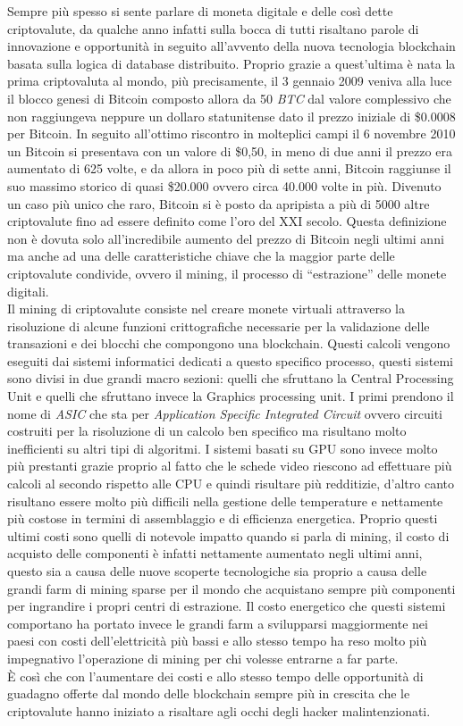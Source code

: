 \documentclass[
11pt, %
oneside, %
english, %
onehalfspacing,%
headsepline, %
]{MastersDoctoralThesis} %
\begin{document}
Sempre più spesso si sente parlare di moneta digitale e delle così dette criptovalute, da qualche anno infatti sulla bocca di tutti risaltano parole di innovazione e opportunità in seguito all'avvento della nuova tecnologia blockchain basata sulla logica di database distribuito. Proprio grazie a quest'ultima è nata la prima criptovaluta al mondo, più precisamente, il 3 gennaio 2009 veniva alla luce il blocco genesi di Bitcoin composto allora da 50 \emph{BTC} dal valore complessivo che non raggiungeva neppure un dollaro statunitense dato il prezzo iniziale di \$0.0008 per Bitcoin. In seguito all'ottimo riscontro in molteplici campi il 6 novembre 2010 un Bitcoin si presentava con un valore di \$0,50, in meno di due anni il prezzo era aumentato di 625 volte, e da allora in poco più di sette anni, Bitcoin raggiunse il suo massimo storico di quasi \$20.000 ovvero circa 40.000 volte in più. Divenuto un caso più unico che raro, Bitcoin si è posto da apripista a più di 5000 altre criptovalute fino ad essere definito come l'oro del \RN{21} secolo. Questa definizione non è dovuta solo all'incredibile aumento del prezzo di Bitcoin negli ultimi anni ma anche ad una delle caratteristiche chiave che la maggior parte delle criptovalute condivide, ovvero il mining, il processo di ``estrazione'' delle monete digitali.\\
Il mining di criptovalute consiste nel creare monete virtuali attraverso la risoluzione di alcune funzioni crittografiche necessarie per la validazione delle transazioni e dei blocchi che compongono una blockchain. Questi calcoli vengono eseguiti dai sistemi informatici dedicati a questo specifico processo, questi sistemi sono divisi in due grandi macro sezioni: quelli che sfruttano la Central Processing Unit e quelli che sfruttano invece la Graphics processing unit. I primi prendono il nome di \emph{ASIC} che sta per \emph{Application Specific Integrated Circuit} ovvero circuiti costruiti per la risoluzione di un calcolo ben specifico ma risultano molto inefficienti su altri tipi di algoritmi. I sistemi basati su GPU sono invece molto più prestanti grazie proprio al fatto che le schede video riescono ad effettuare più calcoli al secondo rispetto alle CPU e quindi risultare più redditizie, d'altro canto risultano essere molto più difficili nella gestione delle temperature e nettamente più costose in termini di assemblaggio e di efficienza energetica. Proprio questi ultimi costi sono quelli di notevole impatto quando si parla di mining, il costo di acquisto delle componenti è infatti nettamente aumentato negli ultimi anni, questo sia a causa delle nuove scoperte tecnologiche sia proprio a causa delle grandi farm di mining sparse per il mondo che acquistano sempre più componenti per ingrandire i propri centri di estrazione. Il costo energetico che questi sistemi comportano ha portato invece le grandi farm a svilupparsi maggiormente nei paesi con costi dell'elettricità più bassi e allo stesso tempo ha reso molto più impegnativo l'operazione di mining per chi volesse entrarne a far parte.\\
È così che con l'aumentare dei costi e allo stesso tempo delle opportunità di guadagno offerte dal mondo delle blockchain sempre più in crescita che le criptovalute hanno iniziato a risaltare agli occhi degli hacker malintenzionati.
\end{document}
